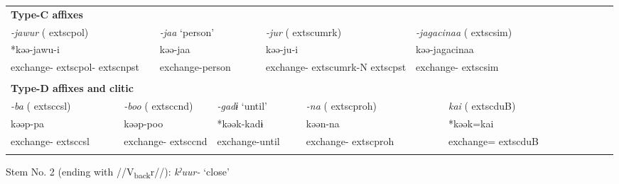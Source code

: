 \begin{tabularx}{\textwidth}{XXXXXXXXXXXXXXXXXXXX}
\multicolumn{20}{X}{{\bfseries Type-C affixes}}\\
\multicolumn{3}{X}{{ \textit{{}-jawur} (	extsc{pol})}} & \multicolumn{2}{X}{{ \textit{{}-jaa} ‘person’}} & \multicolumn{4}{X}{{ \textit{{}-jur} (	extsc{umrk})}} & \multicolumn{11}{X}{{ \textit{{}-jagacinaa} (	extsc{sim})}}\\
\multicolumn{3}{X}{{ *kəə-jawu-i}} & \multicolumn{2}{X}{{ kəə-jaa}} & \multicolumn{4}{X}{kəə-ju-i} & \multicolumn{11}{X}{{ kəə-jagacinaa}}\\
\multicolumn{3}{X}{exchange-	extsc{pol}-	extsc{npst}} & \multicolumn{2}{X}{exchange-person} & \multicolumn{4}{X}{exchange-	extsc{umrk}-N	extsc{pst}} & \multicolumn{11}{X}{exchange-	extsc{sim}}\\
\multicolumn{20}{X}{}\\
\multicolumn{20}{X}{{\bfseries Type-D affixes and clitic}}\\
{ \textit{{}-ba} (	extsc{csl})} & \multicolumn{3}{X}{{ \textit{{}-boo} (	extsc{cnd})}} & \multicolumn{3}{X}{{ \textit{{}-gadɨ} ‘until’}} & \multicolumn{3}{X}{{ \textit{{}-na} (	extsc{proh})}} & \multicolumn{3}{X}{{ \textit{kai} (	extsc{du}B)}} & \multicolumn{7}{X}{}\\
{ kəəp-pa} & \multicolumn{3}{X}{{ kəəp-poo}} & \multicolumn{3}{X}{{ *kəək-kadɨ}} & \multicolumn{3}{X}{{ kəən-na}} & \multicolumn{3}{X}{{ *kəək=kai}} & \multicolumn{7}{X}{}\\
exchange-	extsc{csl} & \multicolumn{3}{X}{exchange-	extsc{cnd}} & \multicolumn{3}{X}{exchange-until} & \multicolumn{3}{X}{exchange-	extsc{proh}} & \multicolumn{3}{X}{exchange=	extsc{du}B} & \multicolumn{7}{X}{}\\
\lspbottomrule
\end{tabularx}
Stem No. 2 (ending with //V\textsubscript{back}r//): \textit{kˀuur-} ‘close’

\tablefirsthead{}

